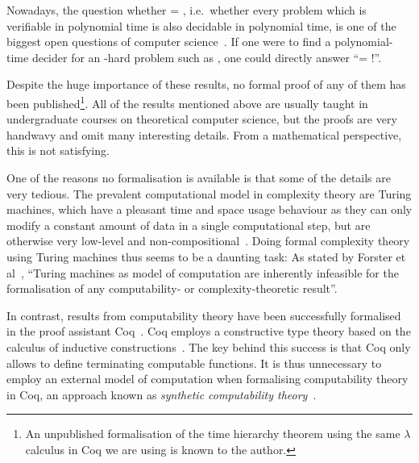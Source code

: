 Nowadays, the question whether \PC{} = \NP{}, i.e.\ whether every problem which is verifiable in polynomial time is also decidable in polynomial time, is one of the biggest open questions of computer science~\cite{claymath}. If one were to find a polynomial-time decider for an \NP{}-hard problem such as \SAT{}, one could directly answer ``\PC{}= \NP{}!''.

Despite the huge importance of these results, no formal proof of any of them has been published\footnote{An unpublished formalisation of the time hierarchy theorem using the same $\lambda$ calculus in Coq we are using is known to the author.}. All of the results mentioned above are usually taught in undergraduate courses on theoretical computer science, but the proofs are very handwavy and omit many interesting details. From a mathematical perspective, this is not satisfying.

One of the reasons no formalisation is available is that some of the details are very tedious. The prevalent computational model in complexity theory are Turing machines, which have a pleasant time and space usage behaviour as they can only modify a constant amount of data in a single computational step, but are otherwise very low-level and non-compositional~\cite{ForsterEtAl:2019:VerifiedTMs}.
Doing formal complexity theory using Turing machines thus seems to be a daunting task: As stated by Forster et al~\cite{ForsterEtAl:2019:VerifiedTMs}, ``Turing machines as model of computation are inherently infeasible for the formalisation of any computability- or complexity-theoretic result''. 

In contrast, results from computability theory have been successfully formalised in the proof assistant Coq~\cite{coqweb}. Coq employs a constructive type theory based on the calculus of inductive constructions~\cite{iclnotes}. The key behind this success is that Coq only allows to define terminating computable functions. It is thus unnecessary to employ an external model of computation when formalising computability theory in Coq, an approach known as \textit{synthetic computability theory}~\cite{ForsterEtAl:2018:On-Synthetic-Undecidability}.


